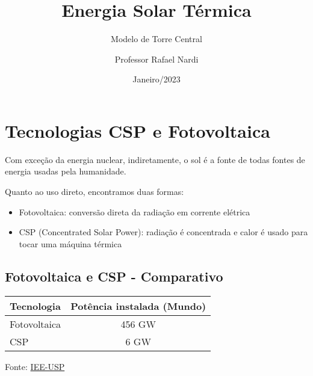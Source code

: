 \documentclass[12pt,notheorems,hyperref={pdfauthor=Professor Rafael Nardi}]{beamer}
\title{Energia Solar Térmica}
\subtitle{Modelo de Torre Central}
\author{Professor Rafael Nardi}
\institute{UFSB}
\date{Janeiro/2023}
\begin{document}
{
\begin{frame}
  \titlepage
\end{frame}
}

\addtocounter{framenumber}{-1}

\section{Tecnologias CSP e Fotovoltaica}


\begin{frame}

	Com exceção da energia nuclear, indiretamente, o sol é a fonte de todas
	fontes de energia usadas pela humanidade.

	\bigskip
	\bigskip

	Quanto ao uso direto, encontramos duas formas:

	\begin{itemize}
		\item Fotovoltaica: conversão direta da radiação em corrente elétrica

		\item CSP (Concentrated Solar Power): radiação é concentrada e calor é usado para tocar uma máquina térmica
	\end{itemize}
\end{frame}


\subsection{Fotovoltaica e CSP - Comparativo}
\begin{frame}

		\begin{table}
			
		\begin{tabular}{|lc|}
			\hline
			\rowcolor{primary}\color{white}Tecnologia & \color{white}Potência instalada (Mundo) \\
		\hline
		Fotovoltaica &  456 GW \\
		CSP &  6 GW  \\
		\hline
	\end{tabular}
	\end{table}
	
	\bigskip
	\bigskip
	\bigskip

	Fonte: \href{https://www.iee.usp.br/}{IEE-USP} 
\end{frame}
\end{document}
